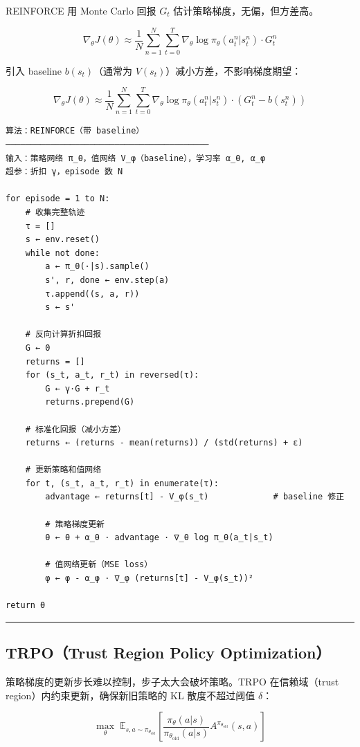 REINFORCE 用 Monte Carlo 回报 \(G_t\) 估计策略梯度，无偏，但方差高。

\[
\nabla_\theta J(\theta) \approx \frac{1}{N}\sum_{n=1}^N \sum_{t=0}^T \nabla_\theta \log \pi_\theta(a_t^n|s_t^n) \cdot G_t^n
\]

引入 baseline \(b(s_t)\)（通常为 \(V(s_t)\)）减小方差，不影响梯度期望：

\[
\nabla_\theta J(\theta) \approx \frac{1}{N}\sum_{n=1}^N \sum_{t=0}^T \nabla_\theta \log \pi_\theta(a_t^n|s_t^n) \cdot (G_t^n - b(s_t^n))
\]

\begin{verbatim}
算法：REINFORCE（带 baseline）
─────────────────────────────────────────
输入：策略网络 π_θ，值网络 V_φ（baseline），学习率 α_θ, α_φ
超参：折扣 γ，episode 数 N

for episode = 1 to N:
    # 收集完整轨迹
    τ = []
    s ← env.reset()
    while not done:
        a ← π_θ(·|s).sample()
        s', r, done ← env.step(a)
        τ.append((s, a, r))
        s ← s'
    
    # 反向计算折扣回报
    G ← 0
    returns = []
    for (s_t, a_t, r_t) in reversed(τ):
        G ← γ·G + r_t
        returns.prepend(G)
    
    # 标准化回报（减小方差）
    returns ← (returns - mean(returns)) / (std(returns) + ε)
    
    # 更新策略和值网络
    for t, (s_t, a_t, r_t) in enumerate(τ):
        advantage ← returns[t] - V_φ(s_t)             # baseline 修正
        
        # 策略梯度更新
        θ ← θ + α_θ · advantage · ∇_θ log π_θ(a_t|s_t)
        
        # 值网络更新（MSE loss）
        φ ← φ - α_φ · ∇_φ (returns[t] - V_φ(s_t))²

return θ
\end{verbatim}

\hrule

\subsection{TRPO（Trust Region Policy Optimization）}

策略梯度的更新步长难以控制，步子太大会破坏策略。TRPO 在信赖域（trust region）内约束更新，确保新旧策略的 KL 散度不超过阈值 \(\delta\)：

\[
\max_\theta \; \mathbb{E}_{s,a \sim \pi_{\theta_\mathrm{old}}}\left[\frac{\pi_\theta(a|s)}{\pi_{\theta_\mathrm{old}}(a|s)} A^{\pi_{\theta_\mathrm{old}}}(s,a)\right]
\]

